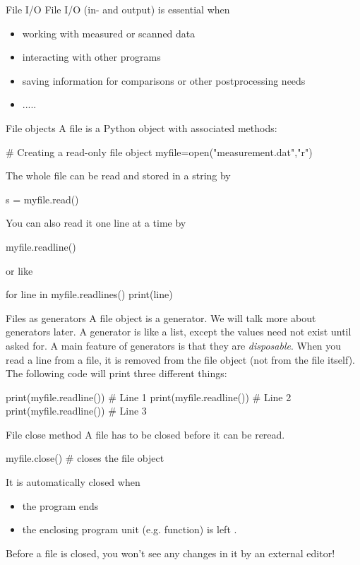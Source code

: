 \documentclass[hyperref={pdfpagelabels=false},table]{beamer}
\begin{document}
\begin{frame}[fragile]{File I/O}
 File I/O (in- and output) is essential when 
\begin{itemize}
\item working with measured or scanned data
\item interacting with other programs 
\item saving information for comparisons or other postprocessing needs
\item .....
\end{itemize}
\end{frame}
\begin{frame}[fragile]{File objects}
A file is a Python object with associated methods:
\begin{python}
 # Creating a read-only file object
 myfile=open("measurement.dat","r") 
\end{python}

The whole file can be read and stored in a string by
\begin{python}
  s = myfile.read()
\end{python}
You can also read it one line at a time by
\begin{python}
myfile.readline()
\end{python}
or like
\begin{python}
for line in myfile.readlines()
  print(line)
\end{python}
\end{frame}


\begin{frame}[fragile]{Files as generators}
A file object is a \alert{generator}. We will talk more about generators later.
\vfill
A generator is like a list, except the values need not exist until asked
for.
\vfill
A main feature of generators is that they are \emph{disposable}.
When you read a line from a file, it is removed from the file object (not from the file itself).
The following code will print three different things:

\begin{python}
print(myfile.readline())  # Line 1
print(myfile.readline())  # Line 2
print(myfile.readline())  # Line 3
\end{python}
\end{frame}


\begin{frame}[fragile]{File close method}
 A file has to be closed before it can be reread.
\begin{python}
 myfile.close() # closes the file object
\end{python}
\vfill
It is automatically closed when 
\begin{itemize}
 \item the program ends
\item the enclosing program unit (e.g. function) is left .
\end{itemize}
\vfill
Before a file is closed, you won't see any changes in it
by an external editor!
\end{frame}
\end{document}
